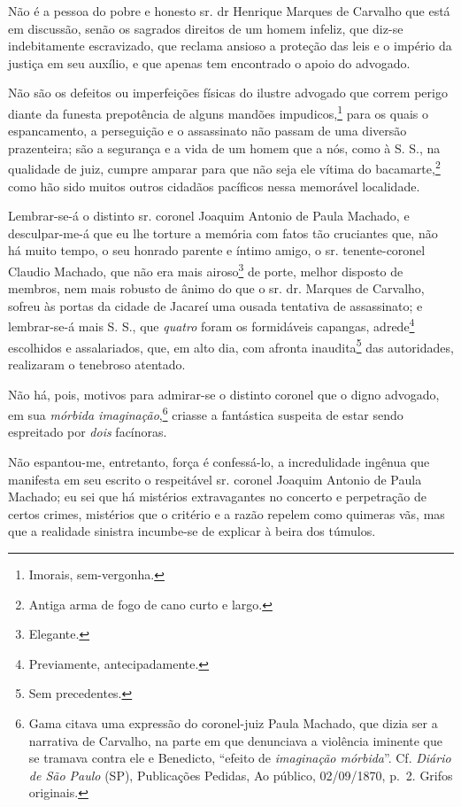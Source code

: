 {Não é a pessoa do pobre e honesto sr. dr Henrique Marques de Carvalho
que está em discussão, senão os sagrados direitos de um homem infeliz,
que diz-se indebitamente escravizado, que reclama ansioso a proteção das
leis e o império da justiça em seu auxílio, e que apenas tem encontrado
o apoio do advogado.

Não são os defeitos ou imperfeições físicas do ilustre advogado que
correm perigo diante da funesta prepotência de alguns mandões
impudicos,\footnote{ Imorais, sem-vergonha.} para os quais o
espancamento, a perseguição e o assassinato não passam de uma diversão
prazenteira; são a segurança e a vida de um homem que a nós, como à S.
S., na qualidade de juiz, cumpre amparar para que não seja ele vítima do
bacamarte,\footnote{ Antiga arma de fogo de cano curto e largo.} como
hão sido muitos outros cidadãos pacíficos nessa memorável localidade.

Lembrar-se-á o distinto sr. coronel Joaquim Antonio de Paula Machado, e
desculpar-me-á que eu lhe torture a memória com fatos tão cruciantes
que, não há muito tempo, o seu honrado parente e íntimo amigo, o sr.
tenente-coronel Claudio Machado, que não era mais airoso\footnote{
  Elegante.} de porte, melhor disposto de membros, nem mais robusto de
ânimo do que o sr. dr. Marques de Carvalho, sofreu às portas da cidade
de Jacareí uma ousada tentativa de assassinato; e lembrar-se-á mais S.
S., que \emph{quatro} foram os formidáveis capangas, adrede\footnote{
  Previamente, antecipadamente.} escolhidos e assalariados, que, em alto
dia, com afronta inaudita\footnote{ Sem precedentes.} das autoridades,
realizaram o tenebroso atentado.

Não há, pois, motivos para admirar-se o distinto coronel que o digno
advogado, em sua \emph{mórbida imaginação},\footnote{ Gama citava uma
  expressão do coronel-juiz Paula Machado, que dizia ser a narrativa de
  Carvalho, na parte em que denunciava a violência iminente que se
  tramava contra ele e Benedicto, ``efeito de \emph{imaginação mórbida}''.
  Cf. \emph{Diário de São Paulo} (SP), Publicações Pedidas, Ao público,
  02/09/1870, p.~2. Grifos originais.} criasse a fantástica suspeita de
estar sendo espreitado por \emph{dois} facínoras.

Não espantou-me, entretanto, força é confessá-lo, a incredulidade
ingênua que manifesta em seu escrito o respeitável sr. coronel Joaquim
Antonio de Paula Machado; eu sei que há mistérios extravagantes no
concerto e perpetração de certos crimes, mistérios que o critério e a
razão repelem como quimeras vãs, mas que a realidade sinistra incumbe-se
de explicar à beira dos túmulos.

}

